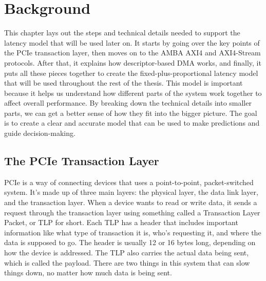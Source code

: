 
\chapter{Background}

\label{Chapter3}


This chapter lays out the steps and technical details needed to support the latency model that will be used later on. It starts by going over the key points of the PCIe transaction layer, then moves on to the AMBA AXI4 and AXI4-Stream protocols. After that, it explains how descriptor-based DMA works, and finally, it puts all these pieces together to create the fixed-plus-proportional latency model that will be used throughout the rest of the thesis. This model is important because it helps us understand how different parts of the system work together to affect overall performance. By breaking down the technical details into smaller parts, we can get a better sense of how they fit into the bigger picture. The goal is to create a clear and accurate model that can be used to make predictions and guide decision-making.


\section{The PCIe Transaction Layer}
\label{sec:ch3_pcie}

PCIe is a way of connecting devices that uses a point-to-point, packet-switched system. It's made up of three main layers: the physical layer, the data link layer, and the transaction layer. When a device wants to read or write data, it sends a request through the transaction layer using something called a Transaction Layer Packet, or TLP for short. Each TLP has a header that includes important information like what type of transaction it is, who's requesting it, and where the data is supposed to go. The header is usually 12 or 16 bytes long, depending on how the device is addressed. The TLP also carries the actual data being sent, which is called the payload. There are two things in this system that can slow things down, no matter how much data is being sent.

